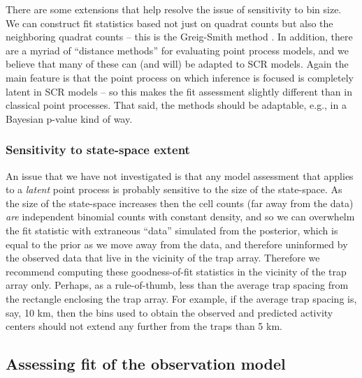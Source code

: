 {There are some extensions that help resolve the issue of sensitivity
to bin size. We can construct fit statistics based not just
on quadrat counts but also the neighboring quadrat counts -- this is
the Greig-Smith method \citep{greig-smith:1964}.
In addition, there are a myriad of ``distance
methods'' for evaluating point process models,
 and we believe that many
of these can (and will) be adapted to SCR models.
Again the main
feature is that the point process on which inference is focused is
completely latent in SCR models -- so this makes the fit assessment
slightly different than in classical point processes. That said, the
methods should be adaptable, e.g., in a Bayesian p-value kind of way.


\subsubsection{Sensitivity to state-space extent}

An issue that we have not investigated is that any model assessment
that applies to a {\it latent} point process is probably sensitive to
the size of the state-space. As the size of the state-space increases
then the cell counts (far away from the data) {\it are} independent
binomial counts with constant density, and so we can overwhelm the fit
statistic with extraneous ``data'' simulated from the posterior, which
is equal to the prior as we move away from the data, and therefore
uninformed by the observed data  that live in the vicinity of the trap array.
Therefore we recommend computing these goodness-of-fit statistics in the vicinity
of the trap array only. Perhaps, as a rule-of-thumb, less than the
average trap spacing from the rectangle enclosing the trap array.
For example, if the average trap spacing is, say,
10 km, then the bins used to obtain the observed and predicted
activity centers should not extend any further from the traps than 5
km.




\subsection{Assessing  fit of the observation model}
\label{gof.sec.obsfit}

}
